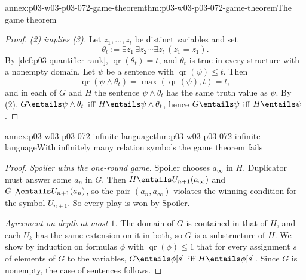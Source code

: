 \begin{annexitem}{annex:p03-w03-p03-072-game-theorem}{thm:p03-w03-p03-072-game-theorem}{The game theorem}
\begin{proof}
\emph{(2) implies (3).}  Let \(z_1,\ldots,z_t\) be distinct variables and set
\[
 \theta_t:=\exists z_1\,\exists z_2\cdots\exists z_t\,(z_1=z_1).
\]
By
\cref{def:p03-quantifier-rank}, \(\operatorname{qr}(\theta_t)=t\), and
\(\theta_t\) is true in every structure with a nonempty domain.  Let
\(\psi\) be a sentence with \(\operatorname{qr}(\psi)\leq t\).  Then
\[
 \operatorname{qr}(\psi\land\theta_t)=\max(\operatorname{qr}(\psi),t)=t,
\]
and in each of \(G\) and \(H\) the sentence \(\psi\land\theta_t\) has the
same truth value as \(\psi\).  By
(2), \(G\entails\psi\land\theta_t\) iff \(H\entails\psi\land\theta_t\), hence
\(G\entails\psi\) iff \(H\entails\psi\).
\end{proof}
\end{annexitem}

\begin{annexitem}{annex:p03-w03-p03-072-infinite-language}{thm:p03-w03-p03-072-infinite-language}{With infinitely many relation symbols the game theorem fails}
\begin{proof}
\emph{Spoiler wins the one-round game.}  Spoiler chooses \(a_\infty\) in
\(H\).  Duplicator must answer some \(a_n\) in \(G\).  Then
\(H\entails U_{n+1}(a_\infty)\) and \(G\not\entails U_{n+1}(a_n)\), so the
pair \((a_n,a_\infty)\) violates the winning condition for the symbol
\(U_{n+1}\).  So every play is won by Spoiler.

\emph{Agreement on depth at most \(1\).}  The domain of \(G\) is contained in
that of \(H\), and each \(U_k\) has the same extension on it in both, so
\(G\) is a substructure of \(H\).  We show by induction on formulas \(\phi\)
with \(\operatorname{qr}(\phi)\leq1\) that for every assignment \(s\) of
elements of \(G\) to the variables,
\(G\entails\phi[s]\) iff \(H\entails\phi[s]\).  Since \(G\) is nonempty, the
case of sentences follows.


\end{proof}
\end{annexitem}
